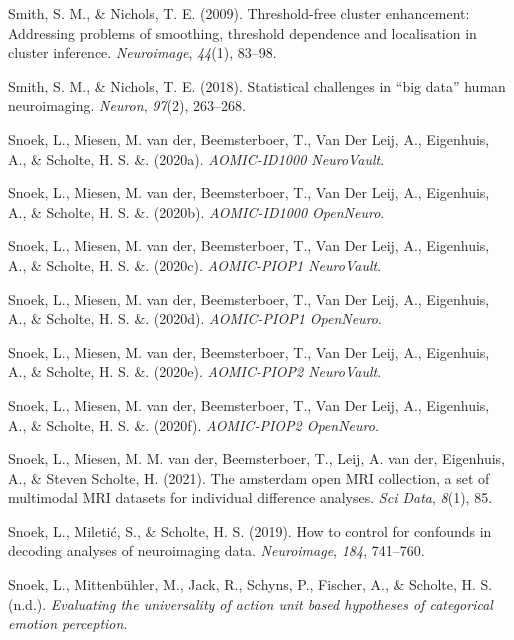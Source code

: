 \documentclass[11pt,american,a4paper,oneside,]{memoir} %
\begin{document}
\leavevmode\hypertarget{ref-smith2009threshold}{}%
Smith, S. M., \& Nichols, T. E. (2009). Threshold-free cluster enhancement: Addressing problems of smoothing, threshold dependence and localisation in cluster inference. \emph{Neuroimage}, \emph{44}(1), 83--98.

\leavevmode\hypertarget{ref-Smith2018-th}{}%
Smith, S. M., \& Nichols, T. E. (2018). Statistical challenges in ``big data'' human neuroimaging. \emph{Neuron}, \emph{97}(2), 263--268.

\leavevmode\hypertarget{ref-Snoek2020n-id1000}{}%
Snoek, L., Miesen, M. van der, Beemsterboer, T., Van Der Leij, A., Eigenhuis, A., \& Scholte, H. S. \&. (2020a). \emph{AOMIC-ID1000 NeuroVault}.

\leavevmode\hypertarget{ref-Snoek2020-id1000}{}%
Snoek, L., Miesen, M. van der, Beemsterboer, T., Van Der Leij, A., Eigenhuis, A., \& Scholte, H. S. \&. (2020b). \emph{AOMIC-ID1000 OpenNeuro}.

\leavevmode\hypertarget{ref-Snoek2020n-piop1}{}%
Snoek, L., Miesen, M. van der, Beemsterboer, T., Van Der Leij, A., Eigenhuis, A., \& Scholte, H. S. \&. (2020c). \emph{AOMIC-PIOP1 NeuroVault}.

\leavevmode\hypertarget{ref-Snoek2020-piop1}{}%
Snoek, L., Miesen, M. van der, Beemsterboer, T., Van Der Leij, A., Eigenhuis, A., \& Scholte, H. S. \&. (2020d). \emph{AOMIC-PIOP1 OpenNeuro}.

\leavevmode\hypertarget{ref-Snoek2020n-piop2}{}%
Snoek, L., Miesen, M. van der, Beemsterboer, T., Van Der Leij, A., Eigenhuis, A., \& Scholte, H. S. \&. (2020e). \emph{AOMIC-PIOP2 NeuroVault}.

\leavevmode\hypertarget{ref-Snoek2020-piop2}{}%
Snoek, L., Miesen, M. van der, Beemsterboer, T., Van Der Leij, A., Eigenhuis, A., \& Scholte, H. S. \&. (2020f). \emph{AOMIC-PIOP2 OpenNeuro}.

\leavevmode\hypertarget{ref-Snoek2021-jx}{}%
Snoek, L., Miesen, M. M. van der, Beemsterboer, T., Leij, A. van der, Eigenhuis, A., \& Steven Scholte, H. (2021). The amsterdam open MRI collection, a set of multimodal MRI datasets for individual difference analyses. \emph{Sci Data}, \emph{8}(1), 85.

\leavevmode\hypertarget{ref-Snoek2019-my}{}%
Snoek, L., Miletić, S., \& Scholte, H. S. (2019). How to control for confounds in decoding analyses of neuroimaging data. \emph{Neuroimage}, \emph{184}, 741--760.

\leavevmode\hypertarget{ref-snoek-submitted}{}%
Snoek, L., Mittenbühler, M., Jack, R., Schyns, P., Fischer, A., \& Scholte, H. S. (n.d.). \emph{Evaluating the universality of action unit based hypotheses of categorical emotion perception}.
\end{document}
